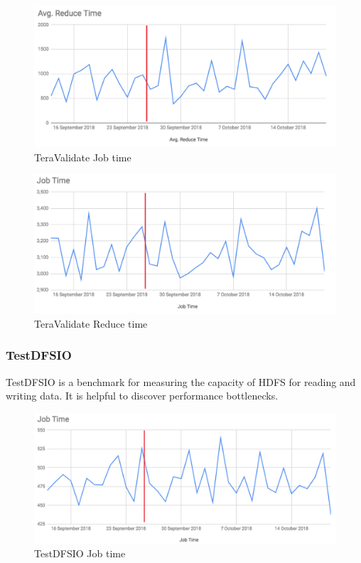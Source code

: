 \begin{figure}[H]
	\includegraphics[width=125mm, keepaspectratio]{figures/teravalidate_job.png}
	\centering
	\caption{TeraValidate Job time}
\end{figure}
\begin{figure}[H]
	\includegraphics[width=125mm, keepaspectratio]{figures/teravalidate_reduce.png}
	\centering
	\caption{TeraValidate Reduce time}
\end{figure}

\subsubsection{TestDFSIO}
TestDFSIO is a benchmark for measuring the capacity of HDFS for reading and writing data. It is helpful to discover performance bottlenecks.

\begin{figure}[H]
	\includegraphics[width=125mm, keepaspectratio]{figures/dfsio_job.png}
	\centering
	\caption{TestDFSIO Job time}
\end{figure}

